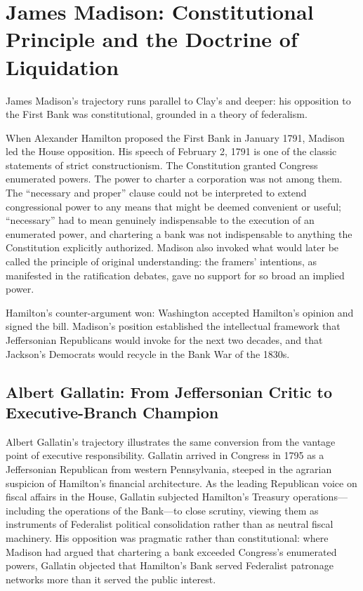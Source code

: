 \documentclass[12pt]{article}
\begin{document}
\section{James Madison: Constitutional Principle and the Doctrine of
         Liquidation}

James Madison's trajectory runs parallel to Clay's and deeper: his
opposition to the First Bank was constitutional, grounded in a theory of federalism.

When Alexander Hamilton proposed the First Bank in January 1791,
Madison led the House opposition.  His speech of February 2, 1791 is one
of the classic statements of strict constructionism.  The Constitution
granted Congress enumerated powers.  The power to charter a corporation
was not among them.  The ``necessary and proper'' clause could not
be interpreted to extend congressional power to any means that might be
deemed convenient or useful; ``necessary'' had to mean genuinely
indispensable to the execution of an enumerated power, and chartering a
bank was not indispensable to anything the Constitution explicitly
authorized.  Madison also invoked what would later be called
the principle of original understanding: the framers'
intentions, as manifested in the ratification debates, gave no
support for so broad an implied power.

Hamilton's counter-argument won: Washington accepted Hamilton's opinion
and signed the bill.  Madison's position established the intellectual framework that Jeffersonian
Republicans would invoke for the next two decades, and that Jackson's
Democrats would recycle in the Bank War of the 1830s.

\subsection{Albert Gallatin: From Jeffersonian Critic to
             Executive-Branch Champion}

Albert Gallatin's trajectory illustrates the same conversion from the
vantage point of executive responsibility.  Gallatin arrived in Congress
in 1795 as a Jeffersonian Republican from western Pennsylvania, steeped
in the agrarian suspicion of Hamilton's financial architecture.  As the
leading Republican voice on fiscal affairs in the House, Gallatin
subjected Hamilton's Treasury operations---including the operations of
the Bank---to close scrutiny, viewing them as instruments of
Federalist political consolidation rather than as neutral fiscal
machinery.  His opposition was pragmatic rather than constitutional:
where Madison had argued that chartering a bank exceeded Congress's
enumerated powers, Gallatin objected that Hamilton's Bank served
Federalist patronage networks more than it served the public interest.
\end{document}
